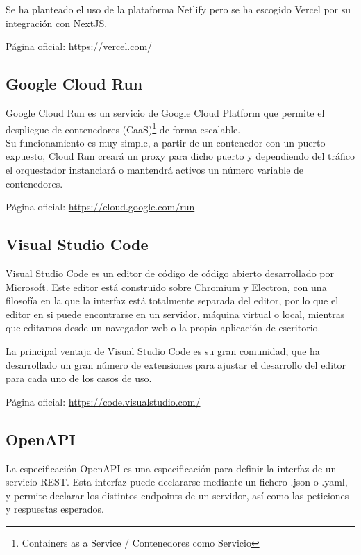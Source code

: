 Se ha planteado el uso de la plataforma Netlify pero se ha escogido Vercel por su integración con NextJS.

Página oficial: \href{https://vercel.com/}{https://vercel.com/}

\hypertarget{google-cloud-run}{%
\subsection{Google Cloud Run}\label{google-cloud-run}}

Google Cloud Run es un servicio de Google Cloud Platform que permite el
despliegue de contenedores (CaaS)\footnote{Containers as a Service / Contenedores como Servicio} de forma escalable.\\
Su funcionamiento es muy simple, a partir de un contenedor con un puerto
expuesto, Cloud Run creará un proxy para dicho puerto y dependiendo del
tráfico el orquestador instanciará o mantendrá activos un número
variable de contenedores.

Página oficial: \href{https://cloud.google.com/run}{https://cloud.google.com/run}

\hypertarget{visual-studio-code}{%
\subsection{Visual Studio Code}\label{visual-studio-code}}

Visual Studio Code es un editor de código de código abierto desarrollado
por Microsoft. Este editor está construido sobre Chromium y Electron,
con una filosofía en la que la interfaz está totalmente separada del
editor, por lo que el editor en si puede encontrarse en un servidor,
máquina virtual o local, mientras que editamos desde un navegador web o
la propia aplicación de escritorio.

La principal ventaja de Visual Studio Code es su gran comunidad, que ha
desarrollado un gran número de extensiones para ajustar el desarrollo
del editor para cada uno de los casos de uso.

Página oficial: \href{https://code.visualstudio.com/}{https://code.visualstudio.com/}

\hypertarget{openapi}{%
\subsection{OpenAPI}\label{openapi}}

La especificación OpenAPI es una especificación para definir la interfaz
de un servicio REST. Esta interfaz puede declararse mediante un fichero .json o .yaml, y permite declarar los distintos endpoints de un servidor,
así como las peticiones y respuestas esperados.

